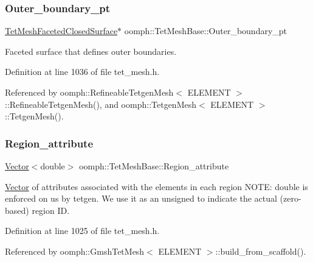 \subsubsection{\texorpdfstring{Outer\+\_\+boundary\+\_\+pt}{Outer\_boundary\_pt}}
{\footnotesize\ttfamily \hyperlink{classoomph_1_1TetMeshFacetedClosedSurface}{Tet\+Mesh\+Faceted\+Closed\+Surface}$\ast$ oomph\+::\+Tet\+Mesh\+Base\+::\+Outer\+\_\+boundary\+\_\+pt\hspace{0.3cm}{\ttfamily [protected]}}



Faceted surface that defines outer boundaries. 



Definition at line 1036 of file tet\+\_\+mesh.\+h.



Referenced by oomph\+::\+Refineable\+Tetgen\+Mesh$<$ E\+L\+E\+M\+E\+N\+T $>$\+::\+Refineable\+Tetgen\+Mesh(), and oomph\+::\+Tetgen\+Mesh$<$ E\+L\+E\+M\+E\+N\+T $>$\+::\+Tetgen\+Mesh().

\mbox{\label{classoomph_1_1TetMeshBase_a27ed0a5a15bb0eb66646ff6f55363a6a}} 
\subsubsection{\texorpdfstring{Region\+\_\+attribute}{Region\_attribute}}
{\footnotesize\ttfamily \hyperlink{classoomph_1_1Vector}{Vector}$<$double$>$ oomph\+::\+Tet\+Mesh\+Base\+::\+Region\+\_\+attribute\hspace{0.3cm}{\ttfamily [protected]}}



\hyperlink{classoomph_1_1Vector}{Vector} of attributes associated with the elements in each region N\+O\+TE\+: double is enforced on us by tetgen. We use it as an unsigned to indicate the actual (zero-\/based) region ID. 



Definition at line 1025 of file tet\+\_\+mesh.\+h.



Referenced by oomph\+::\+Gmsh\+Tet\+Mesh$<$ E\+L\+E\+M\+E\+N\+T $>$\+::build\+\_\+from\+\_\+scaffold().

\mbox{\label{classoomph_1_1TetMeshBase_ad6f68657b2b392f77853af7e147cb23f}} 
